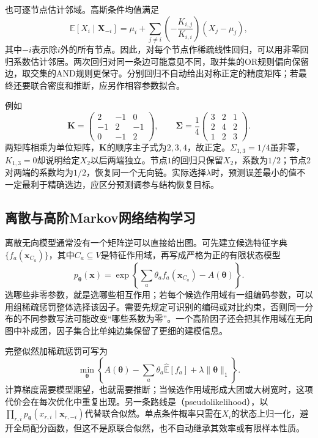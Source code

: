 也可逐节点估计邻域。高斯条件均值满足
\[
  \mathbb{E}[X_i\mid\bm{X}_{-i}]
  =\mu_i+\sum_{j\ne i}
    \left(-\frac{K_{i,j}}{K_{i,i}}\right)(X_j-\mu_j),
\]
其中$-i$表示除$i$外的所有节点。因此，对每个节点作稀疏线性回归，可以用非零回归系数估计邻居。两次回归对同一条边可能意见不同，取并集的OR规则偏向保留边，取交集的AND规则更保守。分别回归不自动给出对称正定的精度矩阵；若最终还要联合密度和推断，应另作相容参数拟合。

例如
\[
  \bm{K}=
  \begin{pmatrix}
    2&-1&0\\
    -1&2&-1\\
    0&-1&2
  \end{pmatrix},
  \qquad
  \bm{\Sigma}=\frac14
  \begin{pmatrix}
    3&2&1\\
    2&4&2\\
    1&2&3
  \end{pmatrix}.
\]
两矩阵相乘为单位矩阵，$\bm{K}$的顺序主子式为$2,3,4$，故正定。$\Sigma_{1,3}=1/4$虽非零，$K_{1,3}=0$却说明给定$X_2$以后两端独立。节点$1$的回归只保留$X_2$，系数为$1/2$；节点$2$对两端的系数均为$1/2$，恢复同一个无向链。实际选择$\lambda$时，预测误差最小的值不一定最利于精确选边，应区分预测调参与结构恢复目标。

\subsection{离散与高阶Markov网络结构学习}
\label{sec:pgm-structure-learning-discrete}

离散无向模型通常没有一个矩阵逆可以直接给出图。可先建立候选特征字典$\{f_a(\bm{x}_{C_a})\}$，其中$C_a\subseteq V$是特征作用域，再写成严格为正的有限状态模型
\[
  p_{\bm{\theta}}(\bm{x})
  =\exp\!\left\{\sum_a\theta_a f_a(\bm{x}_{C_a})
                    -A(\bm{\theta})\right\}.
\]
选哪些非零参数，就是选哪些相互作用；若每个候选作用域有一组编码参数，可以用组稀疏惩罚整体选择该因子。需要先规定可识别的编码或对比约束，否则同一分布的不同参数写法可能改变“哪些系数为零”。一个高阶因子还会把其作用域在无向图中补成团，因子集合比单纯边集保留了更细的建模信息。

完整似然加稀疏惩罚可写为
\[
  \min_{\bm{\theta}}\left\{
    A(\bm{\theta})-\sum_a\theta_a\widehat{\mathbb{E}}[f_a]
      +\lambda\lVert\bm{\theta}\rVert_1\right\}.
\]
计算梯度需要模型期望，也就需要推断；当候选作用域形成大团或大树宽时，这项代价会在每次优化中重复出现。另一条路线是（pseudolikelihood），以$\prod_{r,i}p_{\bm{\theta}}(x_{r,i}\mid\bm{x}_{r,-i})$代替联合似然。单点条件概率只需在$X_i$的状态上归一化，避开全局配分函数，但这不是原联合似然，也不自动继承其效率或有限样本性质。

